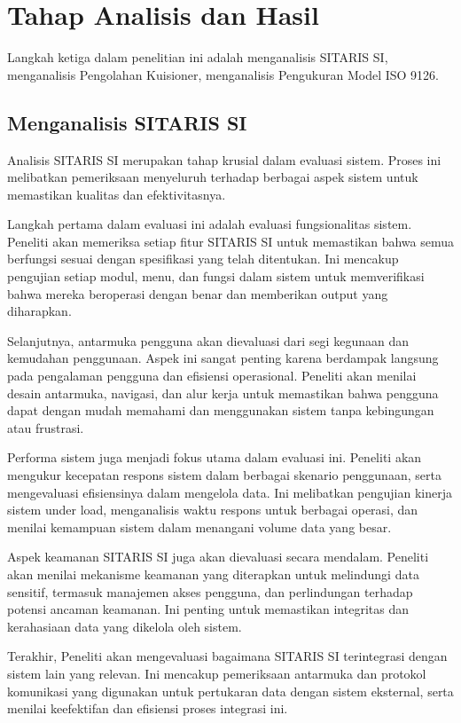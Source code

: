 \section{Tahap Analisis dan Hasil}
Langkah ketiga dalam penelitian ini adalah menganalisis SITARIS SI, menganalisis Pengolahan Kuisioner, menganalisis Pengukuran Model ISO 9126.

\subsection{Menganalisis SITARIS SI}
Analisis SITARIS SI merupakan tahap krusial dalam evaluasi sistem. Proses ini melibatkan pemeriksaan menyeluruh terhadap berbagai aspek sistem untuk memastikan kualitas dan efektivitasnya.

Langkah pertama dalam evaluasi ini adalah evaluasi fungsionalitas sistem. Peneliti akan memeriksa setiap fitur SITARIS SI untuk memastikan bahwa semua berfungsi sesuai dengan spesifikasi yang telah ditentukan. Ini mencakup pengujian setiap modul, menu, dan fungsi dalam sistem untuk memverifikasi bahwa mereka beroperasi dengan benar dan memberikan output yang diharapkan.

Selanjutnya, antarmuka pengguna akan dievaluasi dari segi kegunaan dan kemudahan penggunaan. Aspek ini sangat penting karena berdampak langsung pada pengalaman pengguna dan efisiensi operasional. Peneliti akan menilai desain antarmuka, navigasi, dan alur kerja untuk memastikan bahwa pengguna dapat dengan mudah memahami dan menggunakan sistem tanpa kebingungan atau frustrasi.

Performa sistem juga menjadi fokus utama dalam evaluasi ini. Peneliti akan mengukur kecepatan respons sistem dalam berbagai skenario penggunaan, serta mengevaluasi efisiensinya dalam mengelola data. Ini melibatkan pengujian kinerja sistem under load, menganalisis waktu respons untuk berbagai operasi, dan menilai kemampuan sistem dalam menangani volume data yang besar.

Aspek keamanan SITARIS SI juga akan dievaluasi secara mendalam. Peneliti akan menilai mekanisme keamanan yang diterapkan untuk melindungi data sensitif, termasuk manajemen akses pengguna, dan perlindungan terhadap potensi ancaman keamanan. Ini penting untuk memastikan integritas dan kerahasiaan data yang dikelola oleh sistem.

Terakhir, Peneliti akan mengevaluasi bagaimana SITARIS SI terintegrasi dengan sistem lain yang relevan. Ini mencakup pemeriksaan antarmuka dan protokol komunikasi yang digunakan untuk pertukaran data dengan sistem eksternal, serta menilai keefektifan dan efisiensi proses integrasi ini.

